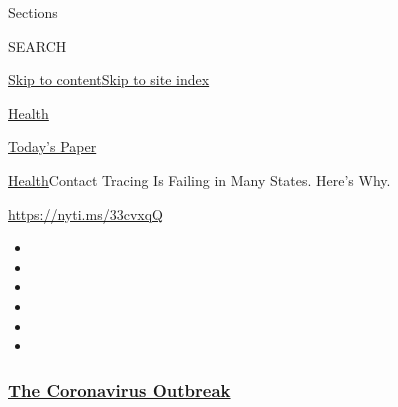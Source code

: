 Sections

SEARCH

\protect\hyperlink{site-content}{Skip to
content}\protect\hyperlink{site-index}{Skip to site index}

\href{https://www.nytimes3xbfgragh.onion/section/health}{Health}

\href{https://myaccount.nytimes3xbfgragh.onion/auth/login?response_type=cookie\&client_id=vi}{}

\href{https://www.nytimes3xbfgragh.onion/section/todayspaper}{Today's
Paper}

\href{/section/health}{Health}\textbar{}Contact Tracing Is Failing in
Many States. Here's Why.

\url{https://nyti.ms/33cvxqQ}

\begin{itemize}
\item
\item
\item
\item
\item
\item
\end{itemize}

\hypertarget{the-coronavirus-outbreak}{%
\subsubsection{\texorpdfstring{\href{https://www.nytimes3xbfgragh.onion/news-event/coronavirus?name=styln-coronavirus-national\&region=TOP_BANNER\&variant=undefined\&block=storyline_menu_recirc\&action=click\&pgtype=Article\&impression_id=8f1f0af0-e395-11ea-8263-afcaec2efa11}{The
Coronavirus
Outbreak}}{The Coronavirus Outbreak}}\label{the-coronavirus-outbreak}}

